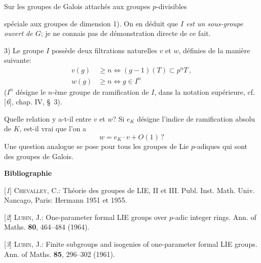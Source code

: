 \begin{center}Sur les groupes de Galois attachés aux groupes $p$-divisibles\end{center}

spéciale aux groupes de dimension 1). On en déduit que \textit{$I$ est un sous-groupe ouvert de $G$}; je ne connais pas de démonstration directe de ce fait.

3) Le groupe $I$ possède deux filtrations naturelles $v$ et $w$, définies de la manière suivante:
\[
\begin{aligned}
v(g)&\geqslant n\Leftrightarrow(g-1)(T)\subset p^nT\,,\\
w(g)&\geqslant n\Leftrightarrow g\in I^n
\end{aligned}
\]
($I^n$ désigne le $n$-ème groupe de ramification de $I$, dans la notation supérieure, cf. [\textit{6}], chap. IV, \S~3).

Quelle relation y a-t-il entre $v$ et $w$? Si $e_K$ désigne l’indice de ramification absolu de $K$, est-il vrai que l’on a
\[
w=e_K\cdot v+O(1)\,?
\]
Une question analogue se pose pour tous les groupes de Lie $p$-adiques qui sont des groupes de Galois.

\begin{center}\textbf{Bibliographie}\end{center}

[\textit{1}] \textsc{Chevalley}, C.: Théorie des groupes de LIE, II et III. Publ. Inst. Math. Univ. Nancago, Paris: Hermann 1951 et 1955.

[\textit{2}] \textsc{Lubin}, J.: One-parameter formal LIE groups over $p$-adic integer rings. Ann. of Maths. \textbf{80}, 464--484 (1964).

[\textit{3}] \textsc{Lubin}, J.: Finite subgroups and isogenies of one-parameter formal LIE groups. Ann. of Maths. \textbf{85}, 296--302 (1961).

